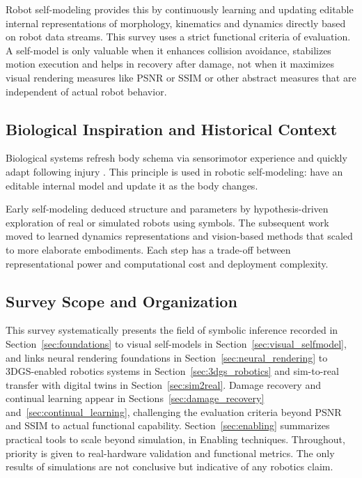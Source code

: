 \documentclass[11pt,a4paper]{article}
\begin{document}
Robot self-modeling provides this by continuously learning and updating editable internal representations of morphology, kinematics and dynamics directly based on robot data streams. This survey uses a strict functional criteria of evaluation. A self-model is only valuable when it enhances collision avoidance, stabilizes motion execution and helps in recovery after damage, not when it maximizes visual rendering measures like PSNR or SSIM or other abstract measures that are independent of actual robot behavior.

\subsection{Biological Inspiration and Historical Context}

Biological systems refresh body schema via sensorimotor experience and quickly adapt following injury \cite{bongard2006resilient}. This principle is used in robotic self-modeling: have an editable internal model and update it as the body changes.

Early self-modeling deduced structure and parameters by hypothesis-driven exploration of real or simulated robots using symbols. The subsequent work moved to learned dynamics representations and vision-based methods that scaled to more elaborate embodiments. Each step has a trade-off between representational power and computational cost and deployment complexity.

\subsection{Survey Scope and Organization}

This survey systematically presents the field of symbolic inference recorded in Section~\ref{sec:foundations} to visual self-models in Section~\ref{sec:visual_selfmodel}, and links neural rendering foundations in Section~\ref{sec:neural_rendering} to 3DGS-enabled robotics systems in Section~\ref{sec:3dgs_robotics} and sim-to-real transfer with digital twins in Section~\ref{sec:sim2real}. Damage recovery and continual learning appear in Sections~\ref{sec:damage_recovery} and~\ref{sec:continual_learning}, challenging the evaluation criteria beyond PSNR and SSIM to actual functional capability. Section~\ref{sec:enabling} summarizes practical tools to scale beyond simulation, in Enabling techniques. Throughout, priority is given to real-hardware validation and functional metrics. The only results of simulations are not conclusive but indicative of any robotics claim.
\end{document}
